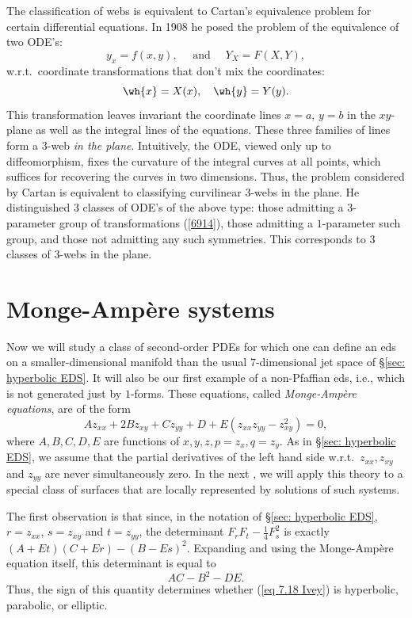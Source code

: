 \begin{hrem*}
    The classification of webs is equivalent to Cartan's equivalence problem for certain differential equations. In 1908 he posed the problem of the equivalence of two ODE's:
    \[y_x=f(x,y),\quad \text{ and }\quad Y_X=F(X,Y),\]
    w.r.t.\ coordinate transformations that don't mix the coordinates:
    \[\wh{x}=X(x),\quad \wh{y}=Y(y).\label{6914}\]
    This transformation leaves invariant the coordinate lines $x=a$, $y=b$ in the $xy$-plane as well as the integral lines of the equations. These three families of lines form a $3$-web \emph{in the plane}. Intuitively, the ODE, viewed only up to diffeomorphism, fixes the curvature of the integral curves at all points, which suffices for recovering the curves in two dimensions. Thus, the problem considered by Cartan is equivalent to classifying curvilinear $3$-webs in the plane. He distinguished $3$ classes of ODE's of the above type: those admitting a $3$-parameter group of transformations (\ref{6914}), those admitting a $1$-parameter such group, and those not admitting any such symmetries. This corresponds to $3$ classes of $3$-webs in the plane.
\end{hrem*}







\section{Monge-Amp\`ere systems}


Now we will study a class of second-order PDEs for which one can define an \gls{eds} on a smaller-dimensional manifold than the usual $7$-dimensional jet space of \S\ref{sec: hyperbolic EDS}. It will also be our first example of a non-Pfaffian \gls{eds}, i.e., which is not generated just by $1$-forms. These equations, called \emph{Monge-Amp\`ere equations}, are of the form 
\[Az_{xx}+2Bz_{xy}+Cz_{yy}+D+E(z_{xx}z_{yy}-z_{xy}^2)=0,\label{eq 7.18 Ivey}\]
where $A,B,C,D,E$ are functions of $x,y,z,p=z_x,q=z_y$. As in \S\ref{sec: hyperbolic EDS}, we assume that the partial derivatives of the left hand side w.r.t.\ $z_{xx},z_{xy}$ and $z_{yy}$ are never simultaneously zero. In the next \sect, we will apply this theory to a special class of surfaces that are locally represented by solutions of such systems.

The first observation is that since, in the notation of \S\ref{sec: hyperbolic EDS}, $r=z_{xx}$, $s=z_{xy}$ and $t=z_{yy}$, the determinant $F_rF_t-\frac14 F_s^2$ is exactly $(A+Et)(C+Er)-(B-Es)^2$. Expanding and using the Monge-Amp\`ere equation itself, this determinant is equal to
\[AC-B^2-DE.\]
Thus, the sign of this quantity determines whether (\ref{eq 7.18 Ivey}) is hyperbolic, parabolic, or elliptic.

